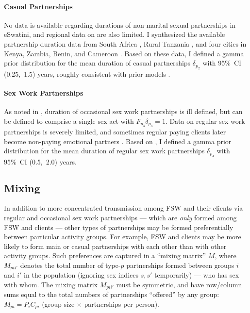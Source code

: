 \paragraph{Casual Partnerships}
No data is available regarding durations of non-marital sexual partnerships in eSwatini,
and regional data on are also limited.
I synthesized the available partnership duration data from
South Africa \cite{Harrison2008,Hargreaves2009,Nguyen2015},
Rural Tanzania \cite{Nnko2004},
and four cities in Kenya, Zambia, Benin, and Cameroon \cite{Ferry2001}.
Based on these data, I defined a gamma prior distribution for
the mean duration of casual partnerships $\delta_{p_{2}}$ with 95\%~CI (0.25,~1.5) years,
roughly consistent with prior models \cite{Johnson2009}.
\paragraph{Sex Work Partnerships}
As noted in , duration of occasional sex work partnerships
is ill defined, but can be defined to comprise a single sex act with $F_{p_{3}}\delta_{p_{3}} = 1$.
Data on regular sex work partnerships is severely limited, and
sometimes regular paying clients later become
non-paying emotional partners \cite{Voeten2007,Mbonye2022}.
Based on \cite{Voeten2002}, I defined a gamma prior distribution for
the mean duration of regular sex work partnerships $\delta_{p_{4}}$ with 95\%~CI (0.5,~2.0) years.
\subsection{Mixing}\label{model.par.mix}
In addition to more concentrated transmission
among FSW and their clients via regular and occasional sex work partnerships
--- which are \emph{only} formed among FSW and clients ---
other types of partnerships may be formed
preferentially between particular activity groups.
For example, FSW and clients may be more likely to form main or casual partnerships
with each other than with other activity groups.
Such preferences are captured in a ``mixing matrix'' $M$, where $M_{pii'}$ denotes
the total number of type-$p$ partnerships formed between groups $i$ and $i'$ in the population
(ignoring sex indices $s,s'$ temporarily)
--- \ie who has sex with whom.
The mixing matrix $M_{pii'}$ must be symmetric,
and have row/column sums equal to the total numbers of partnerships ``offered'' by any group:
$M_{pi} = P_{i} C_{pi}$ (group size $\times$ partnerships per-person).
